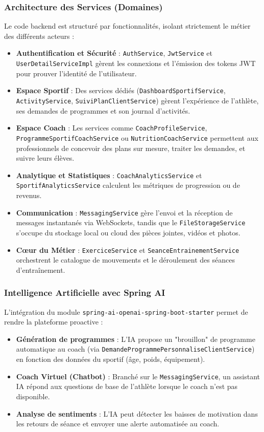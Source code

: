 \subsubsection{Architecture des Services (Domaines)}
Le code backend est structuré par fonctionnalités, isolant strictement le métier des différents acteurs :
\begin{itemize}
    \item \textbf{Authentification et Sécurité} : \texttt{AuthService}, \texttt{JwtService} et \texttt{UserDetailServiceImpl} gèrent les connexions et l'émission des tokens JWT pour prouver l'identité de l'utilisateur.
    \item \textbf{Espace Sportif} : Des services dédiés (\texttt{DashboardSportifService}, \texttt{ActivityService}, \texttt{SuiviPlanClientService}) gèrent l'expérience de l'athlète, ses demandes de programmes et son journal d'activités.
    \item \textbf{Espace Coach} : Les services comme \texttt{CoachProfileService}, \texttt{ProgrammeSportifCoachService} ou \texttt{NutritionCoachService} permettent aux professionnels de concevoir des plans sur mesure, traiter les demandes, et suivre leurs élèves.
    \item \textbf{Analytique et Statistiques} : \texttt{CoachAnalyticsService} et \texttt{SportifAnalyticsService} calculent les métriques de progression ou de revenus.
    \item \textbf{Communication} : \texttt{MessagingService} gère l'envoi et la réception de messages instantanés via WebSockets, tandis que le \texttt{FileStorageService} s'occupe du stockage local ou cloud des pièces jointes, vidéos et photos.
    \item \textbf{Cœur du Métier} : \texttt{ExerciceService} et \texttt{SeanceEntrainementService} orchestrent le catalogue de mouvements et le déroulement des séances d'entraînement.
\end{itemize}

\subsubsection{Intelligence Artificielle avec Spring AI}
L'intégration du module \texttt{spring-ai-openai-spring-boot-starter} permet de rendre la plateforme proactive :
\begin{itemize}
    \item \textbf{Génération de programmes} : L'IA propose un "brouillon" de programme automatique au coach (via \texttt{DemandeProgrammePersonnaliseClientService}) en fonction des données du sportif (âge, poids, équipement).
    \item \textbf{Coach Virtuel (Chatbot)} : Branché sur le \texttt{MessagingService}, un assistant IA répond aux questions de base de l'athlète lorsque le coach n'est pas disponible.
    \item \textbf{Analyse de sentiments} : L'IA peut détecter les baisses de motivation dans les retours de séance et envoyer une alerte automatisée au coach.
\end{itemize}

